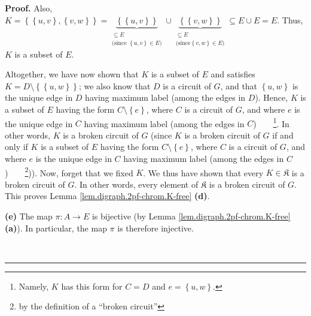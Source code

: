 \documentclass[numbers=enddot,12pt,final,onecolumn,notitlepage]{scrartcl}%
\theoremstyle{definition}
\newenvironment{proof}[1][Proof]{\noindent\textbf{#1.} }{\ \rule{0.5em}{0.5em}}
\newenvironment{verlong}{}{}
\begin{document}
\begin{verlong}
\begin{proof}
Also, $K=\left\{  \left\{  u,v\right\}  ,\left\{  v,w\right\}  \right\}
=\underbrace{\left\{  \left\{  u,v\right\}  \right\}  }_{\substack{\subseteq
E\\\text{(since }\left\{  u,v\right\}  \in E\text{)}}}\cup\underbrace{\left\{
\left\{  v,w\right\}  \right\}  }_{\substack{\subseteq E\\\text{(since
}\left\{  v,w\right\}  \in E\text{)}}}\subseteq E\cup E=E$. Thus, $K$ is a
subset of $E$.

Altogether, we have now shown that $K$ is a subset of $E$ and satisfies
$K=D\setminus\left\{  \left\{  u,w\right\}  \right\}  $; we also know that $D$
is a circuit of $G$, and that $\left\{  u,w\right\}  $ is the unique edge in
$D$ having maximum label (among the edges in $D$). Hence, $K$ is a subset of
$E$ having the form $C\setminus\left\{  e\right\}  $, where $C$ is a circuit
of $G$, and where $e$ is the unique edge in $C$ having maximum label (among
the edges in $C$)\ \ \ \ \footnote{Namely, $K$ has this form for $C=D$ and
$e=\left\{  u,w\right\}  $.}. In other words, $K$ is a broken circuit of $G$
(since $K$ is a broken circuit of $G$ if and only if $K$ is a subset of $E$
having the form $C\setminus\left\{  e\right\}  $, where $C$ is a circuit of
$G$, and where $e$ is the unique edge in $C$ having maximum label (among the
edges in $C$)\ \ \ \ \footnote{by the definition of a \textquotedblleft broken
circuit\textquotedblright})). Now, forget that we fixed $K$. We thus have
shown that every $K\in\mathfrak{K}$ is a broken circuit of $G$. In other
words, every element of $\mathfrak{K}$ is a broken circuit of $G$. This proves
Lemma \ref{lem.digraph.2pf-chrom.K-free} \textbf{(d)}.

\textbf{(e)} The map $\pi:A\rightarrow E$ is bijective (by Lemma
\ref{lem.digraph.2pf-chrom.K-free} \textbf{(a)}). In particular, the map $\pi$
is therefore injective.


\end{proof}
\end{verlong}
\end{document}
